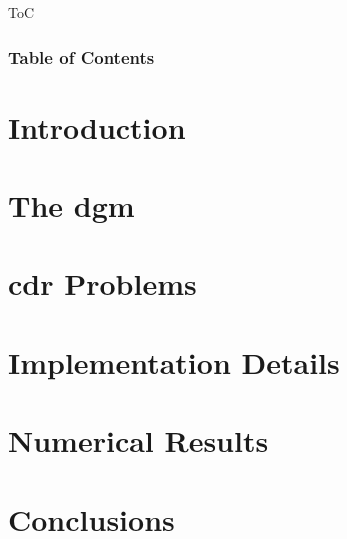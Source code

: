 
\begin{frame}{ToC}
    \frametitle{Table of Contents}

    \vspace*{\fill}
    \tableofcontents[hideallsubsections]
    \vspace*{\fill}
\end{frame}



\section{Introduction}




\section{The \texorpdfstring{\acrlong{dgm}}{}}




\section{\texorpdfstring{\acrlong{cdr}}{} Problems}




\section{Implementation Details}




\section{Numerical Results}




\section{Conclusions}

